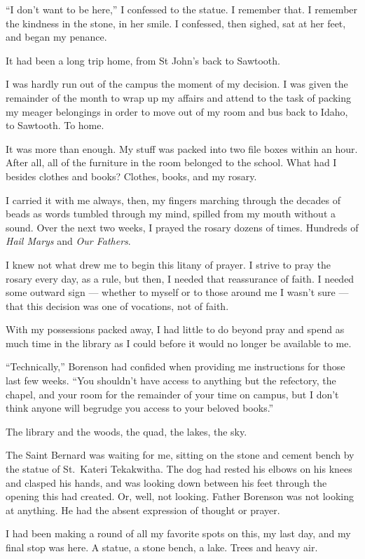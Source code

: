 ``I don't want to be here,'' I confessed to the statue. I remember that. I remember the kindness in the stone, in her smile. I confessed, then sighed, sat at her feet, and began my penance.

It had been a long trip home, from St John's back to Sawtooth.

I was hardly run out of the campus the moment of my decision. I was given the remainder of the month to wrap up my affairs and attend to the task of packing my meager belongings in order to move out of my room and bus back to Idaho, to Sawtooth. To home.

It was more than enough. My stuff was packed into two file boxes within an hour. After all, all of the furniture in the room belonged to the school. What had I besides clothes and books? Clothes, books, and my rosary.

I carried it with me always, then, my fingers marching through the decades of beads as words tumbled through my mind, spilled from my mouth without a sound. Over the next two weeks, I prayed the rosary dozens of times. Hundreds of \emph{Hail Marys} and \emph{Our Fathers}.

I knew not what drew me to begin this litany of prayer. I strive to pray the rosary every day, as a rule, but then, I needed that reassurance of faith. I needed some outward sign --- whether to myself or to those around me I wasn't sure --- that this decision was one of vocations, not of faith.

With my possessions packed away, I had little to do beyond pray and spend as much time in the library as I could before it would no longer be available to me.

``Technically,'' Borenson had confided when providing me instructions for those last few weeks. ``You shouldn't have access to anything but the refectory, the chapel, and your room for the remainder of your time on campus, but I don't think anyone will begrudge you access to your beloved books.''

The library and the woods, the quad, the lakes, the sky.

The Saint Bernard was waiting for me, sitting on the stone and cement bench by the statue of St.~Kateri Tekakwitha. The dog had rested his elbows on his knees and clasped his hands, and was looking down between his feet through the opening this had created. Or, well, not looking. Father Borenson was not looking at anything. He had the absent expression of thought or prayer.

I had been making a round of all my favorite spots on this, my last day, and my final stop was here. A statue, a stone bench, a lake. Trees and heavy air.

